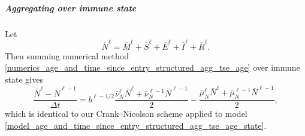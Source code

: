 \documentclass{jpmarticle}
\begin{document}
\subparagraph{Aggregating over immune state}

Let
\begin{equation}
  \bar{N}^{\ell}
  = \bar{M}^{\ell} + \bar{S}^{\ell} + \bar{E}^{\ell}
  + \bar{I}^{\ell} + \bar{R}^{\ell}.
\end{equation}
Then summing numerical method
\eqref{numerics_age_and_time_since_entry_structured_agg_tse_age} over
immune state gives
\begin{equation}
  \label{numerics_age_and_time_since_entry_structured_agg_tse_age_state}
  \frac{\bar{N}^{\ell} - \bar{N}^{\ell - 1}}{\Delta t}
  = b^{\ell - 1 / 2}
  \frac{\bar{\nu}_N^{\ell} \bar{N}^{\ell}
    + \bar{\nu}_N^{\ell - 1} \bar{N}^{\ell - 1}}{2}
  - \frac{\bar{\mu}_N^{\ell} \bar{N}^{\ell}
    + \bar{\mu}_N^{\ell - 1} \bar{N}^{\ell - 1}}{2},
\end{equation}
which is identical to our Crank--Nicolson scheme applied to model
\eqref{model_age_and_time_since_entry_structured_agg_tse_age_state}.


\printbibliography
\end{document}
